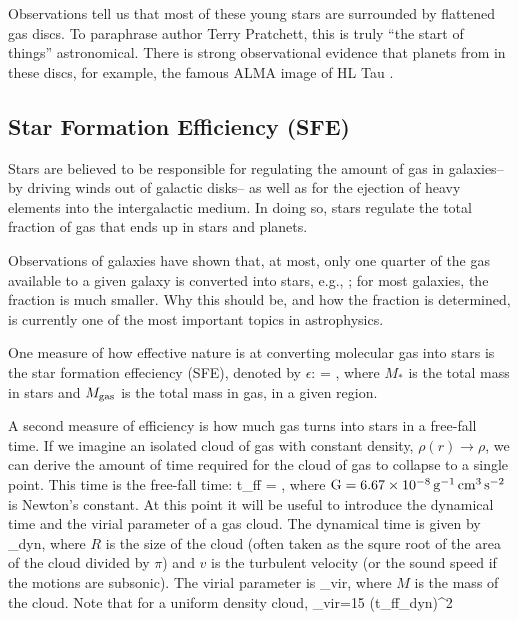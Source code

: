 \documentclass[../dissertation.tex]{subfiles}
\begin{document}
Observations tell us that most of these young stars are surrounded by flattened gas discs. 
To paraphrase author Terry Pratchett, this is truly ``the start of things'' astronomical. 
There is strong observational evidence that planets from in these discs, for example, the famous ALMA image of HL Tau \citep{2015ApJ...808L...3A}.


\subsection{Star Formation Efficiency (SFE)}
Stars are believed to be responsible for regulating the amount of gas in galaxies--by driving winds out of galactic disks-- as well as for the ejection of heavy elements into the intergalactic
medium. In doing so, stars regulate the total fraction of gas that ends up in stars and planets. 
 
Observations of galaxies have shown that, at most, only one quarter of the gas available to a given galaxy is converted into stars, e.g., \citet{2010ApJ...708L..14M}; for most galaxies, the fraction is much smaller. 
Why this should be, and how the fraction is determined, is currently one of the most important topics in astrophysics.

One measure of how effective nature is at converting molecular gas into stars is the star formation effeciency (SFE), denoted by $\epsilon$:
%
\be
\epsilon = ,
\ee
%
where $M_*$ is the total mass in stars and $M_{\rm gas}$ is the total mass in gas, in a given region.

A second measure of efficiency is how much gas turns into stars in a free-fall time. If we imagine an isolated cloud of gas with constant density, $\rho(r) \rightarrow \rho$, we can derive the amount of time required for the cloud of gas to collapse to a single point.
This time is the free-fall time:
%
\be
t_{\rm ff} = ,
\ee
%
where $ {\rm G} = 6.67 \times 10^{-8}\, {\rm g}^{-1}\,\rm cm^3\,\rm s^{-2} $ is Newton's constant. At this point it will be useful to introduce the dynamical time and the virial parameter of a gas cloud. The dynamical time is given by
%
\be
\tau_{\rm dyn},
\ee
%
where $R$ is the size of the cloud (often taken as the squre root of the area of the cloud divided by $\pi$) and $v$ is the turbulent velocity (or the sound speed if the motions are subsonic). The virial parameter is
%
\be
\alpha_{\rm vir},
\ee
%
where $M$ is the mass of the cloud. Note that for a uniform density cloud,
%
\be
\alpha_{\rm vir}={15\pi} \left({t_{\rm ff}\over \tau_{\rm dyn}}\right)^2
\ee
%
\end{document}
